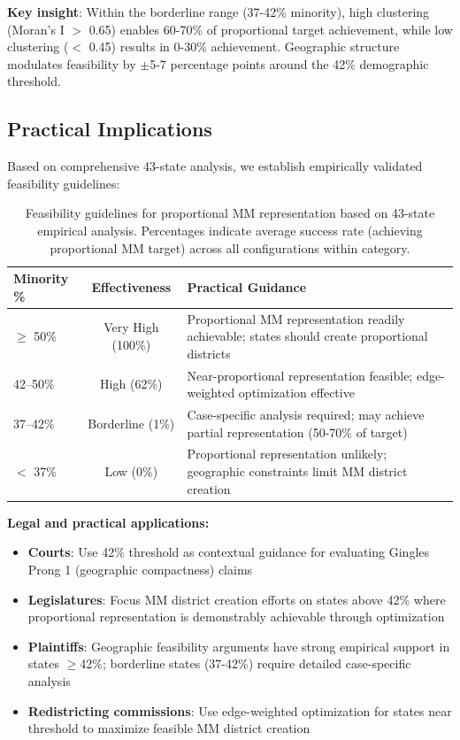 \textbf{Key insight}: Within the borderline range (37-42\% minority), high clustering (Moran's I $>$ 0.65) enables 60-70\% of proportional target achievement, while low clustering ($<$ 0.45) results in 0-30\% achievement. Geographic structure modulates feasibility by $\pm$5-7 percentage points around the 42\% demographic threshold.

\subsection{Practical Implications}

Based on comprehensive 43-state analysis, we establish empirically validated feasibility guidelines:

\begin{table}[h]
\centering
\begin{tabular}{lcp{7cm}}
\toprule
\textbf{Minority \%} & \textbf{Effectiveness} & \textbf{Practical Guidance} \\
\midrule
$\geq$ 50\%   & Very High (100\%)     & Proportional MM representation readily achievable; states should create proportional districts \\[0.2cm]
42--50\%      & High (62\%)           & Near-proportional representation feasible; edge-weighted optimization effective \\[0.2cm]
37--42\%      & Borderline (1\%)      & Case-specific analysis required; may achieve partial representation (50-70\% of target) \\[0.2cm]
$<$ 37\%      & Low (0\%)             & Proportional representation unlikely; geographic constraints limit MM district creation \\
\bottomrule
\end{tabular}
\caption{Feasibility guidelines for proportional MM representation based on 43-state empirical analysis. Percentages indicate average success rate (achieving proportional MM target) across all configurations within category.}
\label{tab:practical_guidelines}
\end{table}

\textbf{Legal and practical applications:}
\begin{itemize}
    \item \textbf{Courts}: Use 42\% threshold as contextual guidance for evaluating Gingles Prong 1 (geographic compactness) claims
    \item \textbf{Legislatures}: Focus MM district creation efforts on states above 42\% where proportional representation is demonstrably achievable through optimization
    \item \textbf{Plaintiffs}: Geographic feasibility arguments have strong empirical support in states $\geq$42\%; borderline states (37-42\%) require detailed case-specific analysis
    \item \textbf{Redistricting commissions}: Use edge-weighted optimization for states near threshold to maximize feasible MM district creation
\end{itemize}
